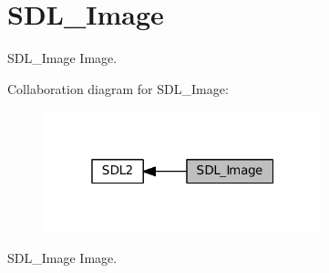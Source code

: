 \hypertarget{group__SDL__Image}{}\section{S\+D\+L\+\_\+\+Image}
\label{group__SDL__Image}


S\+D\+L\+\_\+\+Image Image.  


Collaboration diagram for S\+D\+L\+\_\+\+Image\+:
\nopagebreak
\begin{figure}[H]
\begin{center}
\leavevmode
\includegraphics[width=229pt]{group__SDL__Image}
\end{center}
\end{figure}
S\+D\+L\+\_\+\+Image Image. 

